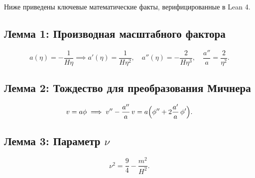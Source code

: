\documentclass[12pt,a4paper]{article}
\begin{document}
Ниже приведены ключевые математические факты, верифицированные в Lean 4.

\subsection*{Лемма 1: Производная масштабного фактора}

\begin{equation}
a(\eta) = -\frac{1}{H\eta} \implies a'(\eta) = \frac{1}{H\eta^2}, \quad a''(\eta) = -\frac{2}{H\eta^3}, \quad \frac{a''}{a} = \frac{2}{\eta^2}.
\end{equation}

\subsection*{Лемма 2: Тождество для преобразования Мичнера}

\begin{equation}
v = a\phi \implies v'' - \frac{a''}{a}\,v = a\Bigl(\phi'' + 2\frac{a'}{a}\,\phi'\Bigr).
\end{equation}

\subsection*{Лемма 3: Параметр $\nu$}

\begin{equation}
\nu^2 = \frac{9}{4} - \frac{m^2}{H^2}.
\end{equation}
\end{document}
